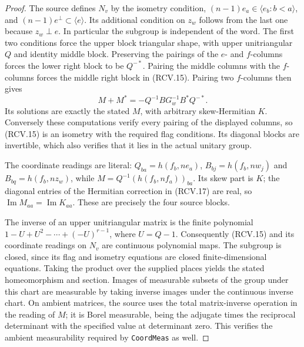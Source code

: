 \documentclass[11pt,a4paper]{article}
\numberwithin{equation}{section}
\theoremstyle{remark}\newtheorem{remark}[theorem]{Remark}
\begin{document}
\begin{proof}
The source defines \(N_v\) by the isometry condition,
\((n-1)e_a\in\langle e_b:b<a\rangle\), and
\((n-1)e^\perp\subset\langle e\rangle\).  Its additional
condition on \(z_w\) follows from the last one because
\(z_w\perp e\).  In particular the subgroup is independent of
the word.  The first two conditions force the upper block triangular
shape, with upper unitriangular \(Q\) and identity middle block.
Preserving the pairings of the \(e\)- and \(f\)-columns forces
the lower right block to be \(Q^{-*}\).  Pairing the middle
columns with the \(f\)-columns forces the middle right block in
(RCV.15).  Pairing two \(f\)-columns then gives
\[
 M+M^*=-Q^{-1}BG_w^{-1}B^*Q^{-*}.
\tag{RCV.17}
\]
Its solutions are exactly the stated \(M\), with arbitrary
skew-Hermitian \(K\).  Conversely these computations verify every
pairing of the displayed columns, so (RCV.15) is an isometry with
the required flag conditions.  Its diagonal blocks are invertible,
which also verifies that it lies in the actual unitary group.

The coordinate readings are literal: \(Q_{ba}=h(f_b,ne_a)\),
\(B_{bj}=h(f_b,nw_j)\) and \(B_{bq}=h(f_b,nz_w)\), while
\(M=Q^{-1}(h(f_b,nf_a))_{ba}\).  Its skew part is \(K\);
the diagonal entries of the Hermitian correction in (RCV.17)
are real, so \(\operatorname{Im}M_{aa}=\operatorname{Im}K_{aa}\).
These are precisely the four source blocks.

The inverse of an upper unitriangular matrix is the finite polynomial
\(1-U+U^2-\cdots+(-U)^{r-1}\), where \(U=Q-1\).
Consequently (RCV.15) and its coordinate readings on \(N_v\)
are continuous polynomial maps.  The subgroup is closed, since its
flag and isometry equations are closed finite-dimensional equations.
Taking the product over the supplied places yields the stated
homeomorphism and section.  Images of measurable subsets of the
group under this chart are measurable by taking inverse images under
the continuous inverse chart.  On ambient matrices, the source uses
the total matrix-inverse operation in the reading of \(M\); it is
Borel measurable, being the adjugate times the reciprocal determinant
with the specified value at determinant zero.  This verifies the
ambient measurability required by \texttt{Coord\allowbreak Meas} as well.
\end{proof}

\end{document}
